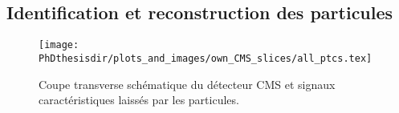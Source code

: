 \subsection{Identification et reconstruction des particules}\label{chapter-LHC-section-evt_reco-subsec-ptc_ID}
\begin{figure}
\texttt{[image: \\PhDthesisdir/plots\_and\_images/own\_CMS\_slices/all\_ptcs.tex]}
\caption[Coupe transverse schématique du détecteur CMS.]{Coupe transverse schématique du détecteur CMS et signaux caractéristiques laissés par les particules.}
\label{fig-chapter-LHC-section-evt_reco-subsec-ptc_ID-cms_slice}
\end{figure}